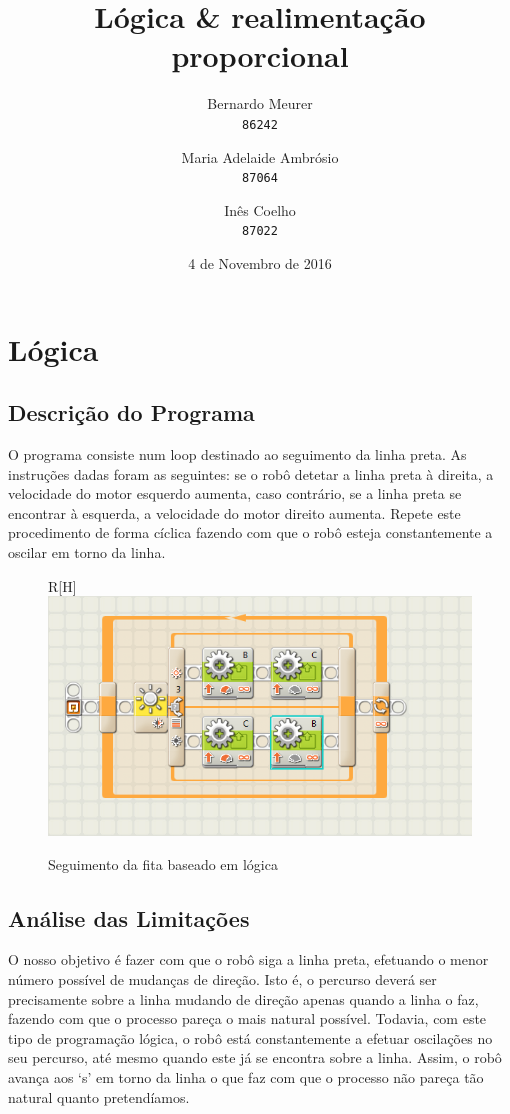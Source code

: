 \documentclass{article}
\title{Lógica \& realimentação proporcional}
\date{4 de Novembro de 2016}
\author{Bernardo Meurer\\
        \texttt{86242}
        \and
        Maria Adelaide Ambrósio\\
        \texttt{87064}
        \and
        Inês Coelho\\
        \texttt{87022}}
\begin{document}
\maketitle
\newpage
\section{Lógica}
\subsection{Descrição do Programa}
O programa consiste num loop destinado ao seguimento da linha preta. As
instruções dadas foram as seguintes: se o robô detetar a linha preta à direita,
a velocidade do motor esquerdo aumenta, caso contrário, se a linha preta se
encontrar à esquerda, a velocidade do motor direito aumenta. Repete este
procedimento de forma cíclica fazendo com que o robô esteja constantemente a
oscilar em torno da linha.
\begin{figure}{R}[H]
    \centering
    \includegraphics[scale=.5]{logica}
    \caption{Seguimento da fita baseado em lógica}
\end{figure}
\subsection{Análise das Limitações}
O nosso objetivo é fazer com que o robô siga a linha preta, efetuando o menor
número possível de mudanças de direção. Isto é, o percurso deverá ser
precisamente sobre a linha mudando de direção apenas quando a linha o faz,
fazendo com que o processo pareça o mais natural possível. Todavia, com este
tipo de programação lógica, o robô está constantemente a efetuar oscilações no
seu percurso, até mesmo quando este já se encontra sobre a linha. Assim, o
robô avança aos `s' em torno da linha o que faz com que o processo não pareça
tão natural quanto pretendíamos.
\end{document}
